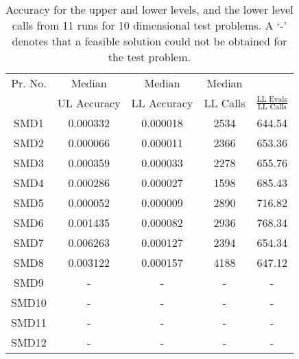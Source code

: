 \documentclass[twoside]{article}
\begin{document}
\begin{table*}[hbt]
\caption{Accuracy for the upper and lower levels, and the lower level calls from 11
  runs for 10 dimensional test problems. A `-' denotes that a feasible solution could not be obtained for the test problem.} 
\label{tab:table2b}
\begin{center}
\begin{tabular}{|c|c|c|c|c|} \hline
Pr. No. & Median & Median & Median &  \\ \cline{2-4}
	& UL Accuracy & LL Accuracy & LL Calls &  $\frac{\mbox{LL Evals}}{\mbox{LL Calls}}$ \\ \hline
SMD1 & 0.000332 & 0.000018 & 2534 & 644.54	\\	\hline
SMD2 & 0.000066 & 0.000011 & 2366 & 653.36	\\	\hline
SMD3 & 0.000359 & 0.000033 & 2278 & 655.76	\\	\hline
SMD4 & 0.000286 & 0.000027 & 1598 & 685.43	\\	\hline
SMD5 & 0.000052 & 0.000009 & 2890 & 716.82	\\	\hline
SMD6 & 0.001435 & 0.000082 & 2936 & 768.34	\\	\hline
SMD7 & 0.006263 & 0.000127 & 2394 &	654.34\\	\hline
SMD8 & 0.003122 & 0.000157 & 4188 &	647.12\\	\hline
SMD9 & - & - & - & - \\	\hline
SMD10 & - & - & - & - 	\\	\hline
SMD11 & - & - & - & - 	\\	\hline
SMD12 & - & - & - & - 	\\	\hline
\end{tabular}
\end{center}
\end{table*}
\end{document}
